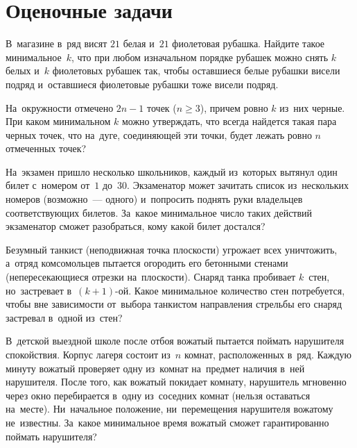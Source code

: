 
\section*{Оценочные задачи}


\begin{problems}

\item
В~магазине в~ряд висят $21$ белая и~$21$ фиолетовая рубашка.
Найдите такое минимальное~$k$, что при любом изначальном порядке рубашек
можно снять $k$ белых и~$k$ фиолетовых рубашек так, чтобы оставшиеся белые
рубашки висели подряд и~оставшиеся фиолетовые рубашки тоже висели
подряд.

\item
На~окружности отмечено $2 n - 1$ точек ($n \geq 3$), причем ровно $k$ из~них
черные.
При каком минимальном $k$ можно утверждать, что всегда найдется такая пара
черных точек, что на~дуге, соединяющей эти точки, будет лежать ровно
$n$ отмеченных точек?

\item
На~экзамен пришло несколько школьников, каждый из~которых вытянул один билет
с~номером от~$1$ до~$30$.
Экзаменатор может зачитать список из~нескольких номеров (возможно~--- одного)
и~попросить поднять руки владельцев соответствующих билетов.
За~какое минимальное число таких действий экзаменатор сможет разобраться, кому
какой билет достался?

\item
Безумный танкист (неподвижная точка плоскости) угрожает всех уничтожить,
а~отряд комсомольцев пытается огородить его бетонными стенами
(непересекающиеся отрезки на~плоскости).
Снаряд танка пробивает $k$~стен, но~застревает в~$(k + 1)$-ой.
Какое минимальное количество стен потребуется, чтобы вне зависимости от~выбора
танкистом направления стрельбы его снаряд застревал в~одной из~стен?

\item
В~детской выездной школе после отбоя вожатый пытается поймать нарушителя
спокойствия.
Корпус лагеря состоит из~$n$ комнат, расположенных в~ряд.
Каждую минуту вожатый проверяет одну из~комнат на~предмет наличия в~ней
нарушителя.
После того, как вожатый покидает комнату, нарушитель мгновенно через окно
перебирается в~одну из~соседних комнат (нельзя оставаться на~месте).
Ни~начальное положение, ни~перемещения нарушителя вожатому не~известны.
За~какое минимальное время вожатый сможет гарантированно поймать нарушителя?


\end{problems}
